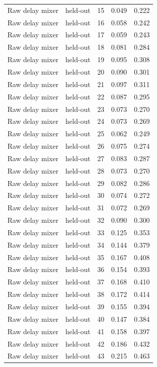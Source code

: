 \begin{tabular}{llrrr}
Raw delay mixer & held-out & 15 & 0.049 & 0.222 \\
Raw delay mixer & held-out & 16 & 0.058 & 0.242 \\
Raw delay mixer & held-out & 17 & 0.059 & 0.243 \\
Raw delay mixer & held-out & 18 & 0.081 & 0.284 \\
Raw delay mixer & held-out & 19 & 0.095 & 0.308 \\
Raw delay mixer & held-out & 20 & 0.090 & 0.301 \\
Raw delay mixer & held-out & 21 & 0.097 & 0.311 \\
Raw delay mixer & held-out & 22 & 0.087 & 0.295 \\
Raw delay mixer & held-out & 23 & 0.073 & 0.270 \\
Raw delay mixer & held-out & 24 & 0.073 & 0.269 \\
Raw delay mixer & held-out & 25 & 0.062 & 0.249 \\
Raw delay mixer & held-out & 26 & 0.075 & 0.274 \\
Raw delay mixer & held-out & 27 & 0.083 & 0.287 \\
Raw delay mixer & held-out & 28 & 0.073 & 0.270 \\
Raw delay mixer & held-out & 29 & 0.082 & 0.286 \\
Raw delay mixer & held-out & 30 & 0.074 & 0.272 \\
Raw delay mixer & held-out & 31 & 0.072 & 0.269 \\
Raw delay mixer & held-out & 32 & 0.090 & 0.300 \\
Raw delay mixer & held-out & 33 & 0.125 & 0.353 \\
Raw delay mixer & held-out & 34 & 0.144 & 0.379 \\
Raw delay mixer & held-out & 35 & 0.167 & 0.408 \\
Raw delay mixer & held-out & 36 & 0.154 & 0.393 \\
Raw delay mixer & held-out & 37 & 0.168 & 0.410 \\
Raw delay mixer & held-out & 38 & 0.172 & 0.414 \\
Raw delay mixer & held-out & 39 & 0.155 & 0.394 \\
Raw delay mixer & held-out & 40 & 0.147 & 0.384 \\
Raw delay mixer & held-out & 41 & 0.158 & 0.397 \\
Raw delay mixer & held-out & 42 & 0.186 & 0.432 \\
Raw delay mixer & held-out & 43 & 0.215 & 0.463 \\

\end{tabular}
